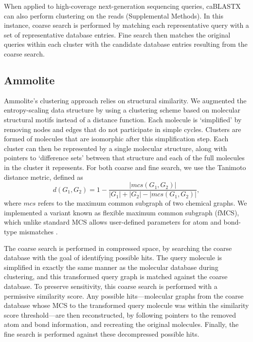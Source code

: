 \documentclass[review,preprint,12pt]{elsarticle}
\renewcommand{\cite}{\citep} %
\theoremstyle{definition}
\theoremstyle{remark}
\numberwithin{equation}{section}
\begin{document}
When applied to high-coverage next-generation sequencing queries, caBLASTX can also perform clustering on the reads (Supplemental Methods).
In this instance, coarse search is performed by matching each representative query with a set of representative database entries.
Fine search then matches the original queries within each cluster with the candidate database entries resulting from the coarse search.

\subsection{Ammolite}
Ammolite's clustering approach relies on structural similarity.
We augmented the entropy-scaling data structure by using a clustering scheme based on molecular structural motifs instead of a distance function.
Each molecule is `simplified' by removing nodes and edges that do not
participate in simple cycles.
Clusters are formed of molecules that are isomorphic after this simplification
step.
Each cluster can then be represented by a single molecular structure, along 
with pointers to `difference sets'  between that structure and each of the 
full molecules in the cluster it represents.
For both coarse and fine search, we use the Tanimoto distance metric, defined as
\[d(G_1,G_2) = 1 - \frac{ |mcs(G_1,G_2)| }{|G_1|+|G_2|-|mcs(G_1,G_2)|},\]
where $mcs$ refers to the maximum common subgraph of two chemical graphs. 
We implemented a variant known as 
flexible maximum common subgraph (fMCS), which unlike standard MCS allows user-defined parameters for atom and bond-type mismatches \cite{cao2008maximum}.

The coarse search is performed in compressed space, by searching 
the coarse database with the goal of identifying possible hits.
The query molecule is simplified in exactly the same manner as 
the molecular database during clustering, and this transformed query graph is 
matched against the coarse database.
To preserve sensitivity, this coarse search is performed with a permissive 
similarity score.
Any possible hits---molecular graphs from the coarse database whose MCS to 
the transformed query molecule was within the similarity score threshold---are 
then reconstructed, by following
pointers to the removed atom and bond information, and recreating the 
original molecules.
Finally, the fine search is performed against these decompressed possible 
hits.
\end{document}
